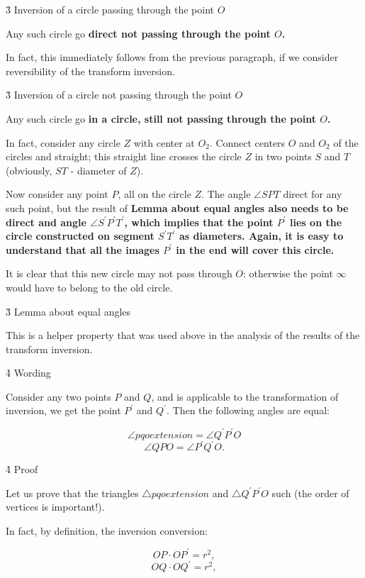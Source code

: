 \h3{ Inversion of a circle passing through the point $O$ }

Any such circle go \bf{direct} not passing through the point $O$.

In fact, this immediately follows from the previous paragraph, if we consider reversibility of the transform inversion.


\h3{ Inversion of a circle not passing through the point $O$ }

Any such circle go \bf{in a circle}, still not passing through the point $O$.


In fact, consider any circle $Z$ with center at $O_2$. Connect centers $O$ and $O_2$ of the circles and straight; this straight line crosses the circle $Z$ in two points $S$ and $T$ (obviously, $ST$ - diameter of $Z$).

Now consider any point $P$, all on the circle $Z$. The angle $\angle SPT$ direct for any such point, but the result of \bf{Lemma about equal angles} also needs to be direct and angle $\angle S^\prime P^\prime T^\prime$, which implies that the point $P^\prime$ lies on the circle constructed on segment $S^\prime T^\prime$ as diameters. Again, it is easy to understand that all the images $P^\prime$ in the end will cover this circle.

It is clear that this new circle may not pass through $O$: otherwise the point $\infty$ would have to belong to the old circle.


\h3{ Lemma about equal angles }

This is a helper property that was used above in the analysis of the results of the transform inversion.

\h4{ Wording }

Consider any two points $P$ and $Q$, and is applicable to the transformation of inversion, we get the point $P^\prime$ and $Q^\prime$. Then the following angles are equal:

$$ \angle pqo extension = \angle Q^\prime P^\prime O $$
$$ \angle QPO = \angle P^\prime Q^\prime O. $$

\h4{ Proof }

Let us prove that the triangles $\triangle pqo extension$ and $\triangle Q^\prime P^\prime O$ such (the order of vertices is important!).


In fact, by definition, the inversion conversion:

$$ OP \cdot OP^\prime = r^2, $$
$$ OQ \cdot OQ^\prime = r^2, $$

